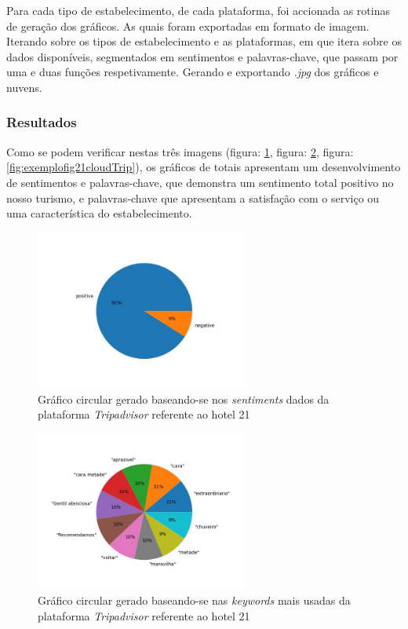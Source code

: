 Para cada tipo de estabelecimento, de cada plataforma, foi accionada as rotinas de geração dos gráficos. As quais foram exportadas em formato de imagem. Iterando sobre os tipos de estabelecimento e as plataformas, em que itera sobre os dados disponíveis, segmentados em sentimentos e palavras-chave, que passam por uma e duas funções respetivamente. Gerando e exportando \textit{.jpg} dos gráficos e nuvens.

\subsubsection{Resultados}

Como se podem verificar nestas três imagens (figura: \ref{fig:exemplofig21sentimentsTrip},  figura: \ref{fig:exemplofig21keywordsTrip}, figura: \ref{fig:exemplofig21cloudTrip}), os gráficos de totais apresentam um desenvolvimento de sentimentos e palavras-chave, que demonstra um sentimento total positivo no nosso turismo, e palavras-chave que apresentam a satisfação com o serviço ou uma característica do estabelecimento.

\begin{figure}[!htb]
\centering
\includegraphics[width=7cm]{figuras/TripAdvisor/Hotels/hotel21_sentiments.jpeg}
\caption{Gráfico circular gerado baseando-se nos \textit{sentiments} dados da plataforma \textit{Tripadvisor} referente ao hotel 21 }
\label{fig:exemplofig21sentimentsTrip}
\end{figure}

\begin{figure}[!htb]
\centering
\includegraphics[width=7cm]{figuras/TripAdvisor/Hotels/hotel21_keywords.jpeg}
\caption{Gráfico circular gerado baseando-se nas \textit{keywords} mais usadas da plataforma \textit{Tripadvisor} referente ao hotel 21}
\label{fig:exemplofig21keywordsTrip}
\end{figure}

